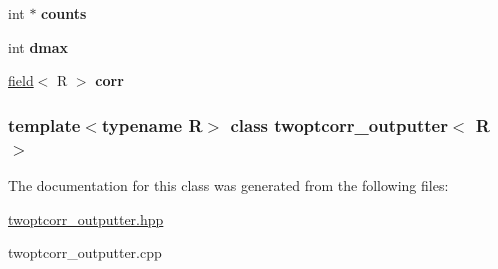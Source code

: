 \begin{DoxyCompactItemize}
\item 
\hypertarget{classtwoptcorr__outputter_af7480fc82800941d6411a96d1bc5541b}{
int $\ast$ {\bfseries counts}}
\label{classtwoptcorr__outputter_af7480fc82800941d6411a96d1bc5541b}

\item 
\hypertarget{classtwoptcorr__outputter_a94311fae5d6a70fe4161b9f517175af9}{
int {\bfseries dmax}}
\label{classtwoptcorr__outputter_a94311fae5d6a70fe4161b9f517175af9}

\item 
\hypertarget{classtwoptcorr__outputter_aff7c05700048aed218b0eb8e5a45ea1e}{
\hyperlink{classfield}{field}$<$ R $>$ {\bfseries corr}}
\label{classtwoptcorr__outputter_aff7c05700048aed218b0eb8e5a45ea1e}

\end{DoxyCompactItemize}
\subsubsection*{template$<$typename R$>$ class twoptcorr\_\-outputter$<$ R $>$}



The documentation for this class was generated from the following files:\begin{DoxyCompactItemize}
\item 
\hyperlink{twoptcorr__outputter_8hpp}{twoptcorr\_\-outputter.hpp}\item 
twoptcorr\_\-outputter.cpp\end{DoxyCompactItemize}
